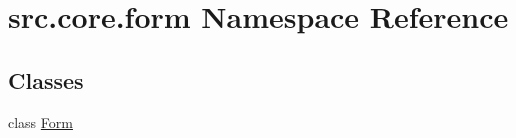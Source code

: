 \hypertarget{namespacesrc_1_1core_1_1form}{\section{src.\+core.\+form Namespace Reference}
\label{namespacesrc_1_1core_1_1form}
}
\subsection*{Classes}
\begin{DoxyCompactItemize}
\item 
class \hyperlink{classsrc_1_1core_1_1form_1_1_form}{Form}
\end{DoxyCompactItemize}
